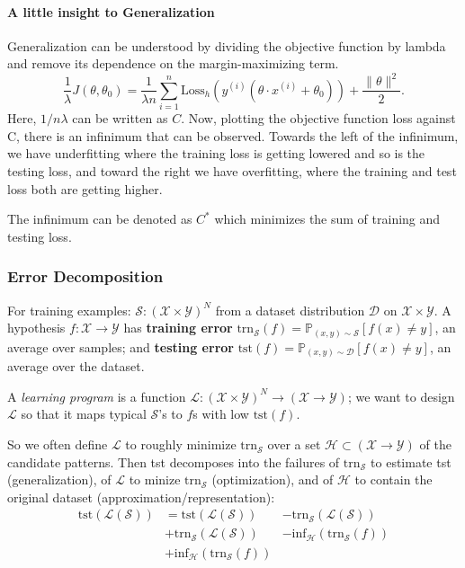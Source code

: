 \documentclass{article}
\begin{document}
\paragraph{A little insight to Generalization}
Generalization can be understood by dividing the objective function by lambda and remove its dependence on the margin-maximizing term.\[\frac{1}{\lambda}J(\theta, \theta_0)=
\frac{1}{\lambda n}\sum\limits_{i=1}^n\text{Loss}_h\left(y^{(i)}(\theta\cdot x^{(i)}+\theta_0)\right)+\frac{\lVert\theta\rVert^2}{2}.\]
Here, $1/n\lambda$ can be written as $C$. Now, plotting the objective function loss against C, there is an infinimum that can be observed. Towards the left of the infinimum, we have underfitting where the training loss is getting lowered and so is the testing loss, and toward the right we have overfitting, where the training and test loss both are getting higher. 

The infinimum can be denoted as $C^{*}$ which minimizes the sum of training and testing loss.

\subsubsection{Error Decomposition}
For training examples: $\mathcal{S}:(\mathcal{X}\times\mathcal{Y})^N$ from a dataset distribution $\mathcal{D}$ on $\mathcal{X}\times\mathcal{Y}$. A hypothesis $f:\mathcal{X}\rightarrow\mathcal{Y}$ has \textbf{training error} $\text{trn}_\mathcal{S}(f)=\mathbb{P}_{(x,y)\sim\mathcal{S}}[f(x)\neq y]$, an average over samples; and \textbf{testing error} $\text{tst}(f)=\mathbb{P}_{(x,y)\sim\mathcal{D}}[f(x)\neq y]$, an average over the dataset.

A \emph{learning program} is a function $\mathcal{L}:(\mathcal{X}\times\mathcal{Y})^N\rightarrow(\mathcal{X}\rightarrow\mathcal{Y})$; we want to design $\mathcal{L}$ so that it maps typical $\mathcal{S}$'s to $f$s with low $\text{tst}(f)$.


So we often define $\mathcal{L}$ to roughly minimize $\text{trn}_\mathcal{S}$ over a set $\mathcal{H}\subset(\mathcal{X}\rightarrow\mathcal{Y})$ of the candidate patterns. Then tst decomposes into the failures of $\text{trn}_\mathcal{S}$ to estimate tst (generalization), of $\mathcal{L}$ to minize $\text{trn}_\mathcal{S}$ (optimization), and of $\mathcal{H}$ to contain the original dataset (approximation/representation):
\begin{align*}
	\text{tst}(\mathcal{L}(\mathcal{S}))&=\text{tst}(\mathcal{L}(\mathcal{S}))&-\text{trn}_\mathcal{S}(\mathcal{L}(\mathcal{S}))\tag{generalization error}\\
	&+\text{trn}_\mathcal{S}(\mathcal{L}(\mathcal{S}))&-\text{inf}_{\mathcal{H}}(\text{trn}_{\mathcal{S}}(f))\tag{optimization error}\\
	&+\text{inf}_{\mathcal{H}}(\text{trn}_\mathcal{S}(f))&{}\tag{approximation error}
\end{align*}
\end{document}

